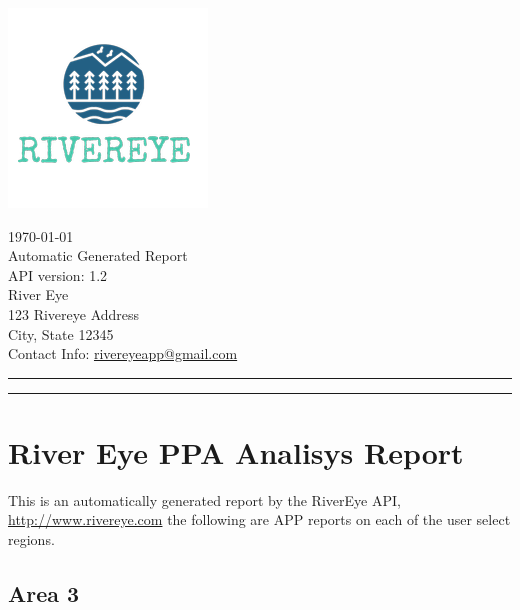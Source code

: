 \documentclass{article}
\begin{document}
    \begin{minipage}{0.6\linewidth}
        \includegraphics[width=0.7\linewidth]{LogoRiverEye.jpg}
    \end{minipage}\hfil
    \begin{minipage}{0.4\linewidth}
        \today \bigskip \\
        Automatic Generated Report \\
        API version: {1.2} \\
        River Eye \\
        123 Rivereye Address \\
        City, State 12345 \\
        Contact Info: \href{mailto:rivereyeapp@gmail.com}{rivereyeapp@gmail.com} \\

    
    \end{minipage}
    \vspace{-3em}

    \rule{\linewidth}{1pt}
    \rule{\linewidth}{1pt}

    \hfill


    \section{River Eye PPA Analisys Report}
    This is an automatically generated report by the RiverEye API, \url{http://www.rivereye.com} the following are APP reports on each of the user select regions.
    \bigskip

    \subsection{Area 3}
\end{document}
